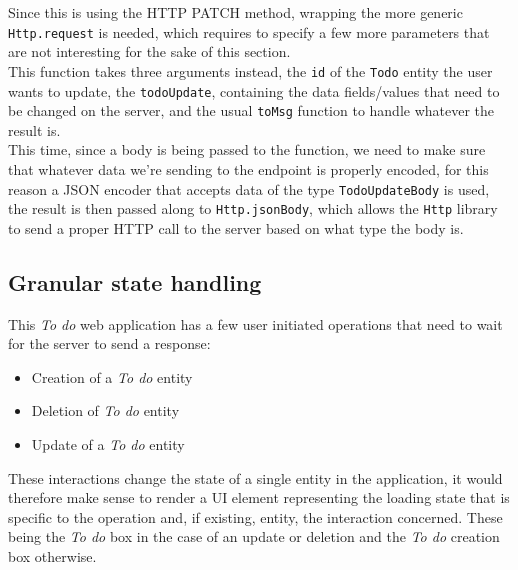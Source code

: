 \begin{sloppypar}
Since this is using the HTTP PATCH method, wrapping the more generic \texttt{Http.request} is needed, which requires to specify a few more parameters that are not interesting for the sake of this section.\\
This function takes three arguments instead, the \texttt{id} of the \texttt{Todo} entity the user wants to update, the \texttt{todoUpdate}, containing the data fields/values that need to be changed on the server, and the usual \texttt{toMsg} function to handle whatever the result is.\\
This time, since a body is being passed to the function, we need to make sure that whatever data we're sending to the endpoint is properly encoded, for this reason a JSON encoder that accepts data of the type \texttt{TodoUpdateBody} is used, the result is then passed along to \texttt{Http.jsonBody}, which allows the \texttt{Http} library to send a proper HTTP call to the server based on what type the body is.
\end{sloppypar}

\subsection{Granular state handling}
This \textit{To do} web application has a few user initiated operations that need to wait for the server to send a response:
\begin{itemize}
    \item Creation of a \textit{To do} entity
    \item Deletion of \textit{To do} entity
    \item Update of a \textit{To do} entity
\end{itemize}
These interactions change the state of a single entity in the application, it would therefore make sense to render a UI element representing the loading state that is specific to the operation and, if existing, entity, the interaction concerned. These being the \textit{To do} box in the case of an update or deletion and the \textit{To do} creation box otherwise.\\

